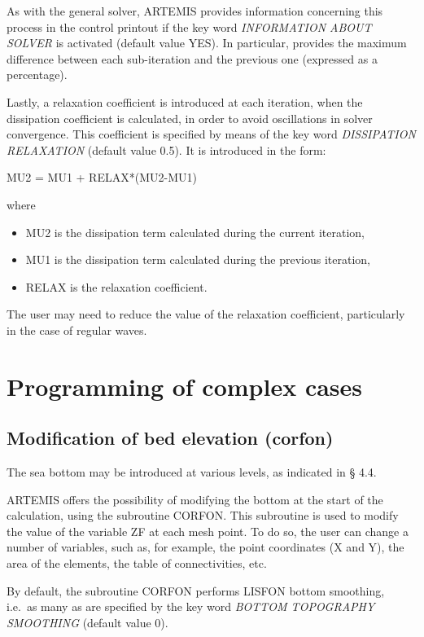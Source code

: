 As with the general solver, ARTEMIS provides information concerning this
process in the control printout if the key word \textit{INFORMATION ABOUT
SOLVER} is activated (default value YES). In particular, \artemis{} provides
the maximum difference between each sub-iteration and the previous one
(expressed as a percentage).

Lastly, a relaxation coefficient is introduced at each iteration, when the
dissipation coefficient is calculated, in order to avoid oscillations in solver
convergence. This coefficient is specified by means of the key word
\textit{DISSIPATION RELAXATION} (default value 0.5). It is introduced in the
form:

MU2 = MU1 + RELAX*(MU2-MU1)

where
\begin{itemize}
  \item MU2 is the dissipation term calculated during the current iteration,
  \item MU1 is the dissipation term calculated during the previous iteration,
  \item RELAX is the relaxation coefficient.
\end{itemize}

The user may need to reduce the value of the relaxation coefficient,
particularly in the case of regular waves.


\chapter{Programming of complex cases}


\section{Modification of bed elevation (corfon)}

The sea bottom may be introduced at various levels, as indicated in {\S} 4.4.

ARTEMIS offers the possibility of modifying the bottom at the start of the
calculation, using the subroutine CORFON\@. This subroutine is used to modify the
value of the variable ZF at each mesh point. To do so, the user can change a
number of variables, such as, for example, the point coordinates (X and Y), the
area of the elements, the table of connectivities, etc.

By default, the subroutine CORFON performs LISFON bottom smoothing, i.e.\ as
many as are specified by the key word \textit{BOTTOM TOPOGRAPHY SMOOTHING}
(default value 0).


